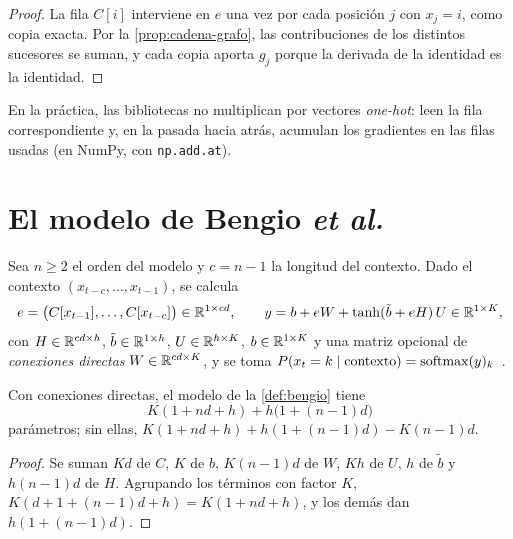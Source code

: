 \begin{proof}
La fila $C[i]$ interviene en $e$ una vez por cada posición $j$ con $x_j=i$, como copia exacta. Por la \cref{prop:cadena-grafo}, las contribuciones de los distintos sucesores se suman, y cada copia aporta $g_j$ porque la derivada de la identidad es la identidad.
\end{proof}

En la práctica, las bibliotecas no multiplican por vectores \emph{one-hot}: leen la fila correspondiente y, en la pasada hacia atrás, acumulan los gradientes en las filas usadas (en NumPy, con \texttt{np.add.at}).

\section{El modelo de Bengio \emph{et al.}}

\begin{definicion}\label{def:bengio}
Sea $n\ge 2$ el orden del modelo y $c=n-1$ la longitud del contexto. Dado el contexto $(x_{t-c},\dots,x_{t-1})$, se calcula
\[
e=\bigl(C[x_{t-1}],\dots,C[x_{t-c}]\bigr)\in\mathbb{R}^{1\times cd},\qquad
y=b+eW+\tanh(\tilde b+eH)\,U\in\mathbb{R}^{1\times K},
\]
con $H\in\mathbb{R}^{cd\times h}$, $\tilde b\in\mathbb{R}^{1\times h}$, $U\in\mathbb{R}^{h\times K}$, $b\in\mathbb{R}^{1\times K}$ y una matriz opcional de \emph{conexiones directas} $W\in\mathbb{R}^{cd\times K}$, y se toma $P(x_t=k\mid\text{contexto})=\operatorname{softmax}(y)_k$~\cite[§2]{bengio}.
\end{definicion}

\begin{proposicion}\label{prop:param-bengio}
Con conexiones directas, el modelo de la \cref{def:bengio} tiene
\[
K(1+nd+h)+h\bigl(1+(n-1)d\bigr)
\]
parámetros; sin ellas, $K(1+nd+h)+h(1+(n-1)d)-K(n-1)d$.
\end{proposicion}

\begin{proof}
Se suman $Kd$ de $C$, $K$ de $b$, $K(n-1)d$ de $W$, $Kh$ de $U$, $h$ de $\tilde b$ y $h(n-1)d$ de $H$. Agrupando los términos con factor $K$, $K(d+1+(n-1)d+h)=K(1+nd+h)$, y los demás dan $h(1+(n-1)d)$.
\end{proof}

